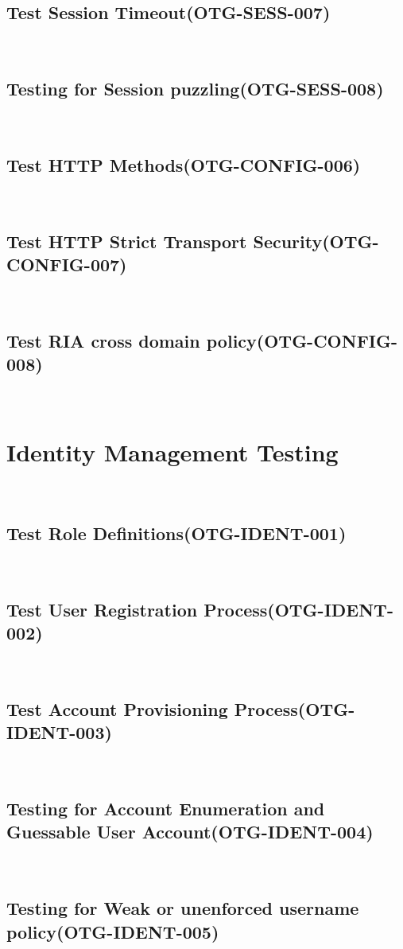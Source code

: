\documentclass[headsepline,footsepline,footinclude=false,oneside,fontsize=11pt,paper=a4,listof=totoc,bibliography=totoc]{scrbook} %
\begin{document}
\subsection{Test Session Timeout(OTG-SESS-007)}\
\pagebreak 
\subsection{Testing for Session puzzling(OTG-SESS-008)}\ 

\pagebreak 



\subsection{Test HTTP Methods(OTG-CONFIG-006)}\
\pagebreak 
\subsection{Test HTTP Strict Transport Security(OTG-CONFIG-007)}\
\pagebreak 
\subsection{Test RIA cross domain policy(OTG-CONFIG-008)}\

 
\pagebreak 
\section{Identity Management Testing}\
\subsection{Test Role Definitions(OTG-IDENT-001)}\
\pagebreak 
\subsection{Test User Registration Process(OTG-IDENT-002)}\
\pagebreak 
\subsection{Test Account Provisioning Process(OTG-IDENT-003)}\
\pagebreak 
\subsection{Testing for Account Enumeration and Guessable User Account(OTG-IDENT-004)}\
\pagebreak 
\subsection{Testing for Weak or unenforced username policy(OTG-IDENT-005)}\
 
\end{document}
